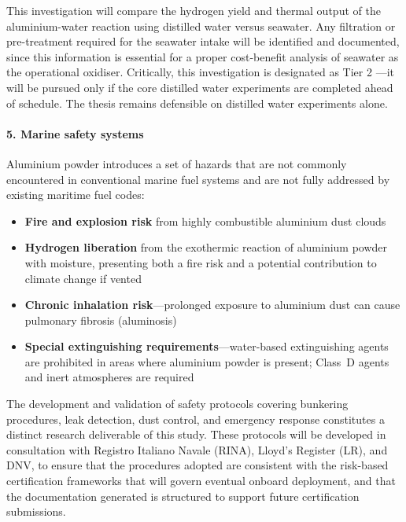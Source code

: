 \documentclass[12pt]{article}
\begin{document}
This investigation will compare the hydrogen yield and thermal output of the 
aluminium-water reaction using distilled water versus seawater. Any filtration or 
pre-treatment required for the seawater intake will be identified and documented, 
since this information is essential for a proper cost-benefit analysis of seawater 
as the operational oxidiser. Critically, this investigation is designated as Tier 2
---it will be pursued only if the core distilled water experiments are completed 
ahead of schedule. The thesis remains defensible on distilled water experiments 
alone.

\paragraph{5. Marine safety systems}

Aluminium powder introduces a set of hazards that are not commonly encountered in 
conventional marine fuel systems and are not fully addressed by existing maritime 
fuel codes:

\begin{itemize}
    \item \textbf{Fire and explosion risk} from highly combustible aluminium dust 
    clouds
    \item \textbf{Hydrogen liberation} from the exothermic reaction of aluminium 
    powder with moisture, presenting both a fire risk and a potential contribution 
    to climate change if vented
    \item \textbf{Chronic inhalation risk}---prolonged exposure to aluminium dust 
    can cause pulmonary fibrosis (aluminosis)
    \item \textbf{Special extinguishing requirements}---water-based extinguishing 
    agents are prohibited in areas where aluminium powder is present; Class~D agents 
    and inert atmospheres are required
\end{itemize}

The development and validation of safety protocols covering bunkering procedures, 
leak detection, dust control, and emergency response constitutes a distinct research 
deliverable of this study. These protocols will be developed in consultation with 
Registro Italiano Navale (RINA), Lloyd's Register (LR), and DNV, to ensure that the 
procedures adopted are consistent with the risk-based certification frameworks that 
will govern eventual onboard deployment, and that the documentation generated is 
structured to support future certification submissions.
\end{document}
